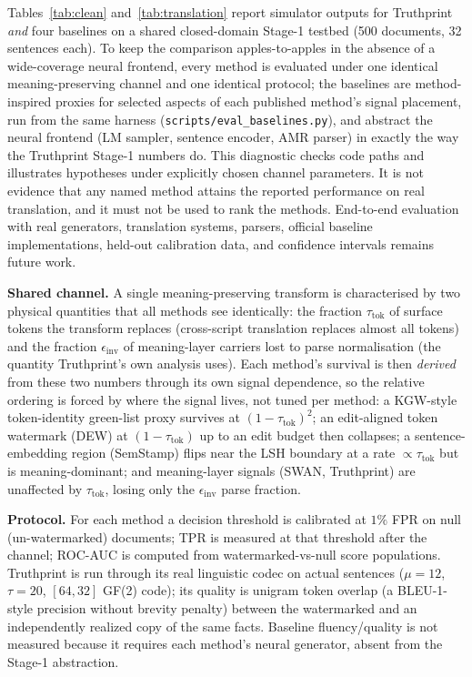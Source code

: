 \documentclass[11pt]{article}
\begin{document}
Tables~\ref{tab:clean} and~\ref{tab:translation} report simulator outputs for
Truthprint \emph{and} four baselines on a shared closed-domain Stage-1
testbed (500 documents, 32 sentences each). To keep the comparison
apples-to-apples in the absence of a wide-coverage neural frontend, every
method is evaluated under one identical meaning-preserving channel and one
identical protocol; the baselines are method-inspired proxies for selected aspects of each published
method's signal placement, run from the
same harness (\texttt{scripts/eval\_baselines.py}), and abstract the neural
frontend (LM sampler, sentence encoder, AMR parser) in exactly the way the
Truthprint Stage-1 numbers do. This diagnostic checks code paths and illustrates hypotheses under explicitly
chosen channel parameters. It is not evidence that any named method attains the
reported performance on real translation, and it must not be used to rank the
methods. End-to-end evaluation with real generators, translation systems,
parsers, official baseline implementations, held-out calibration data, and
confidence intervals remains future work.

\textbf{Shared channel.} A single meaning-preserving transform is
characterised by two physical quantities that all methods see identically:
the fraction $\tau_{\mathrm{tok}}$ of surface tokens the transform replaces
(cross-script translation replaces almost all tokens) and the fraction
$\epsilon_{\mathrm{inv}}$ of meaning-layer carriers lost to parse
normalisation (the quantity Truthprint's own analysis uses). Each method's
survival is then \emph{derived} from these two numbers through its own signal
dependence, so the relative ordering is forced by where the signal lives, not
tuned per method: a KGW-style token-identity green-list proxy survives at
$(1-\tau_{\mathrm{tok}})^2$; an edit-aligned token watermark (DEW) at
$(1-\tau_{\mathrm{tok}})$ up to an edit budget then collapses; a
sentence-embedding region (SemStamp) flips near the LSH boundary at a rate
$\propto\tau_{\mathrm{tok}}$ but is meaning-dominant; and meaning-layer
signals (SWAN, Truthprint) are unaffected by $\tau_{\mathrm{tok}}$, losing
only the $\epsilon_{\mathrm{inv}}$ parse fraction.

\textbf{Protocol.} For each method a decision threshold is calibrated at
$1\%$ FPR on null (un-watermarked) documents; TPR is measured at that
threshold after the channel; ROC-AUC is computed from watermarked-vs-null
score populations. Truthprint is run through its real linguistic codec on
actual sentences ($\mu=12$, $\tau=20$, $[64,32]$ GF(2) code); its quality is
unigram token overlap (a BLEU-1-style precision without brevity penalty)
between the watermarked and an independently realized copy of the same facts. Baseline fluency/quality is not measured because it requires each
method's neural generator, absent from the Stage-1 abstraction.
\end{document}
